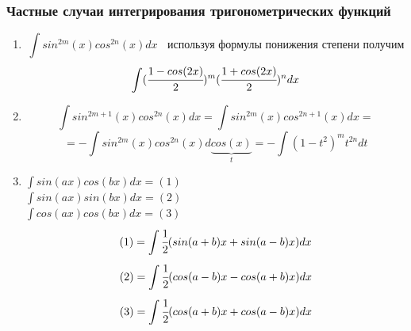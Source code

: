 \documentclass[a4paper]{article}
\theoremstyle{definition}
\numberwithin{theorem}{subsection}
\numberwithin{lemma}{subsection}
\numberwithin{definition}{subsection}
\numberwithin{comment*}{subsection}
\numberwithin{consequence}{subsection}
\numberwithin{property}{subsection}
\begin{document}
\subsubsection{Частные случаи интегрирования тригонометрических функций}
\begin{enumerate}
 \item $$\int sin^{2m}(x) cos^{2n}(x) dx \ \ \ \ \textit{используя формулы понижения степени получим} $$ $$  \int (\cfrac{1-cos(2x)}{2})^m (\cfrac{1+cos(2x)}{2})^n dx $$
 \item $$\int sin^{2m+1}(x) cos^{2n}(x) dx = \int sin^{2m}(x) cos^{2n+1}(x) dx = $$
       $$= - \int sin^{2m}(x) cos^{2n}(x) d \underbrace{cos(x)}_{t} = -\int (1-t^2)^m t^{2n} dt$$
 \item $\int sin(ax)cos(bx) dx = (1) $\\
       $\int sin(ax)sin(bx) dx = (2)$\\
       $\int cos(ax)cos(bx) dx = (3)$\\
       $$(1)=\int \cfrac{1}{2}(sin(a+b)x+sin(a-b)x) dx$$
       $$(2)=\int \cfrac{1}{2}(cos(a-b)x-cos(a+b)x) dx$$
       $$(3)=\int \cfrac{1}{2}(cos(a+b)x+cos(a-b)x) dx$$
\end{enumerate}
\end{document}

